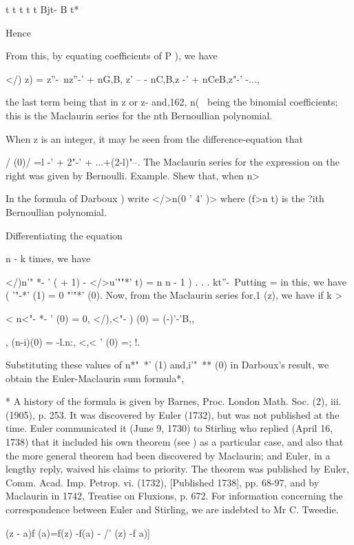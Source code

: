 t t t t t Bjt- B t*

Hence

From this, by equating coefficients of P ), we have

</) z) = z''-\ nz''-' + nG,B, z' -- - nC,B,z -' + nCeB,z"-' -...,

the last term being that in z or z- and,162, n( \,   being the
binomial coefficients; this is the Maclaurin series for the nth
Bernoullian polynomial.

When z is an integer, it may be seen from the difference-equation that

 / (0)/ =l -' + 2"-' + ...+(2-l)"--. The Maclaurin series for the
expression on the right was given by Bernoulli. Example. Shew that,
when n>\,


In the formula of Darboux ) write </>n(0 ' 4' )> where (f>n t)
is the ?ith Bernoullian polynomial.

Differentiating the equation

n - k times, we have

</)n'" *- ' ( + 1) - </>u'""*' t) = n n - 1 ) . . . kt''-\ Putting =
in this, we have ( '"-*' (1) = 0 "'"*' (0). Now, from the Maclaurin
series for,1 (z), we have if k >

< n<"- *- ' (0) = 0, </),<"- ) (0) = (-)'-'B,,

, (n-i)(0) = -l.n:, <,< ' (0) =; !.

Substituting these values of n*"~*' (1) and,i'"~** (0) in Darboux's
result, we obtain the Euler-Maclaurin sum formula*,

* A history of the formula is given by Barnes, Proc. London Math. Soc.
(2), iii. (1905), p. 253. It was discovered by Euler (1732), but was
not published at the time. Euler communicated it (June 9, 1730) to
Stirling who replied (April 16, 1738) that it included his own theorem
(see ) as a particular case, and also that the more general
theorem had been discovered by Maclaurin; and Euler, in a lengthy
reply, waived his claims to priority. The theorem was published by
Euler, Comm. Acad. Imp. Petrop. vi. (1732), [Published 1738], pp.
68-97, and by Maclaurin in 1742, Treatise on Fluxions, p. 672. For
information concerning the correspondence between Euler and Stirling,
we are indebted to Mr C. Tweedie.

%
%

(z - a)f (a)=f(z) -f(a) - /' (z) -f a)]

